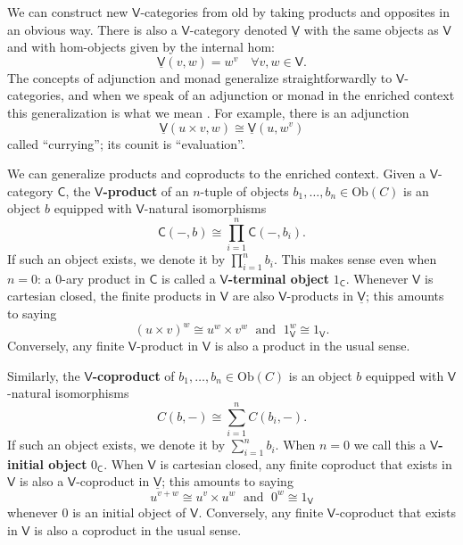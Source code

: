 \documentclass{amsart}
\theoremstyle{definition}
\newcommand{\V}{\mathsf{V}}
\newcommand{\C}{\mathsf{C}}
\newcommand{\Obj}{\mathrm{Ob}}
\begin{document}
We can construct new $\V$-categories from old by taking products and opposites in an obvious way.   There is also a $\V$-category denoted $\underline{\V}$ with the same objects as 
$\V$ and with hom-objects given by the internal hom:
\[   \underline{\V}(v,w) = w^v   \quad \forall v,w \in \V  .\]
The concepts of adjunction and monad generalize straightforwardly to $\V$-categories,
and when we speak of an adjunction or monad in the enriched context this generalization
is what we mean \cite{kelly}.   For example, there is an adjunction
\[    \underline{\V}(u \times v, w) \cong \underline{\V}(u, w^v ) \]
called ``currying''; its counit is ``evaluation''.  

We can generalize products and coproducts to the enriched context.
Given a $\V$-category $\C$,  the \textbf{$\V$-product} of an $n$-tuple of 
objects $b_1, \dots , b_n \in \Obj(C)$ is an object $b$ equipped with $\V$-natural
isomorphisms 
\[          \C(-,b) \cong \prod_{i=1}^n \C(-,b_i). \]
If such an object exists, we denote it by $\prod_{i=1}^n b_i$.   This makes sense
even when $n = 0$: a 0-ary product in $\C$ is called a \textbf{$\V$-terminal object} $1_\C$.   Whenever $\V$ is cartesian closed, the finite products in $\V$ are also $\V$-products in 
$\underline{\V}$; this amounts to saying
\[           (u \times v)^w \cong u^w \times v^w \; \textrm{ and } \; 1_\V^w \cong 1_\V .\]
Conversely, any finite $\V$-product in $\V$ is also a product in the usual sense.

Similarly, the \textbf{$\V$-coproduct} of $b_1, \dots, b_n \in \Obj(C)$ is an object
$b$ equipped with $\V$-natural isomorphisms
\[           C(b,-) \cong \sum_{i = 1}^n C(b_i,-). \]
If such an object exists, we denote it by $\sum_{i=1}^n b_i$.  
When $n=0$ we call this a \textbf{$\V$-initial object} $0_\C$.   When $\V$ is cartesian
closed, any finite coproduct that exists in $\V$ is also a $\V$-coproduct in $\underline{\V}$;
this amounts to saying
\[          u^{v+w} \cong u^v \times u^w \; \textrm{ and } \;  0^w \cong 1_\V \]
whenever $0$ is an initial object of $\V$.  Conversely, any finite $\V$-coproduct that
exists in $\V$ is also a coproduct in the usual sense.
\end{document}
